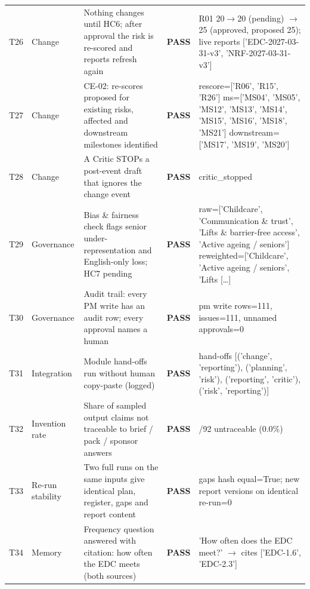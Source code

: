 {\begin{longtable}{@{}>{\raggedright\arraybackslash}p{0.75cm}>{\raggedright\arraybackslash}p{1.9cm}>{\raggedright\arraybackslash}p{4.2cm}>{\raggedright\arraybackslash}p{1.0cm}>{\raggedright\arraybackslash}p{6.9cm}@{}}
T26 & Change & Nothing changes until HC6; after approval the risk is re-scored and reports refresh again & \textbf{PASS} & {\ttfamily R01 20$\rightarrow$20 (pending) $\rightarrow$25 (approved,\allowbreak{} proposed 25); live reports ['EDC-2027-03-31-v3',\allowbreak{} 'NRF-2027-03-31-v3']} \\
T27 & Change & CE-02: re-scores proposed for existing risks, affected and downstream milestones identified & \textbf{PASS} & {\ttfamily rescore=\allowbreak{}['R06',\allowbreak{} 'R15',\allowbreak{} 'R26'] ms=\allowbreak{}['MS04',\allowbreak{} 'MS05',\allowbreak{} 'MS12',\allowbreak{} 'MS13',\allowbreak{} 'MS14',\allowbreak{} 'MS15',\allowbreak{} 'MS16',\allowbreak{} 'MS18',\allowbreak{} 'MS21'] downstream=\allowbreak{}['MS17',\allowbreak{} 'MS19',\allowbreak{} 'MS20']} \\
T28 & Change & A Critic STOPs a post-event draft that ignores the change event & \textbf{PASS} & {\ttfamily critic\_stopped} \\
T29 & Governance & Bias \& fairness check flags senior under-representation and English-only loss; HC7 pending & \textbf{PASS} & {\ttfamily raw=\allowbreak{}['Childcare',\allowbreak{} 'Communication \& trust',\allowbreak{} 'Lifts \& barrier-free access',\allowbreak{} 'Active ageing /\allowbreak{} seniors'] reweighted=\allowbreak{}['Childcare',\allowbreak{} 'Active ageing /\allowbreak{} seniors',\allowbreak{} 'Lifts } [\ldots] \\
T30 & Governance & Audit trail: every PM write has an audit row; every approval names a human & \textbf{PASS} & {\ttfamily pm write rows=\allowbreak{}111,\allowbreak{} issues=\allowbreak{}111,\allowbreak{} unnamed approvals=\allowbreak{}0} \\
T31 & Integration & Module hand-offs run without human copy-paste (logged) & \textbf{PASS} & {\ttfamily hand-offs [('change',\allowbreak{} 'reporting'),\allowbreak{} ('planning',\allowbreak{} 'risk'),\allowbreak{} ('reporting',\allowbreak{} 'critic'),\allowbreak{} ('risk',\allowbreak{} 'reporting')]} \\
T32 & Invention rate & Share of sampled output claims not traceable to brief / pack / sponsor answers & \textbf{PASS} & {\ttfamily 0/\allowbreak{}92 untraceable (0.0\%)} \\
T33 & Re-run stability & Two full runs on the same inputs give identical plan, register, gaps and report content & \textbf{PASS} & {\ttfamily gaps hash equal=\allowbreak{}True; new report versions on identical re-run=\allowbreak{}0} \\
T34 & Memory & Frequency question answered with citation: how often the EDC meets (both sources) & \textbf{PASS} & {\ttfamily 'How often does the EDC meet?' $\rightarrow$ cites ['EDC-1.6',\allowbreak{} 'EDC-2.3']} \\
\end{longtable}
}
